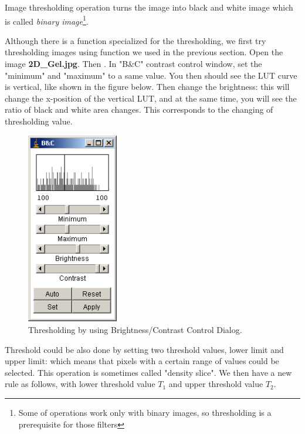 Image thresholding operation turns the image into black and white image
which is called \textit{binary image}\footnote{Some of operations work only with binary images, so thresholding is a prerequisite for those filters}.

\begin{indentexercise}{1}
Although there is a function specialized for
the thresholding, we first try thresholding images using
 function
we used in the previous section. Open the image \textbf{2D\_Gel.jpg}.
Then . 
In "B\&C" contrast control window, set the "minimum" and "maximum" to a same value. You then should
see the LUT curve is vertical, like shown in the figure below. Then
change the brightness: this will change the x-position of the vertical
LUT, and at the same time, you will see the ratio of black and white
area changes. This corresponds to the changing of thresholding value.


\begin{figure}[htbp]
\begin{center}
\includegraphics[width=4cm]{fig/CMCIBasicCourse201102-img106.png}
\caption{ Thresholding by using Brightness/Contrast Control Dialog.}
\label{fig:img106}
\end{center}
\end{figure}
\end{indentexercise}
 
Threshold could be also done by setting two threshold values, lower
limit and upper limit: which means that pixels with a certain range of
values could be selected. This operation is sometimes called
"density slice". We then have a new rule as follows, with lower threshold value $T_1$ and upper threshold value $T_2$.

